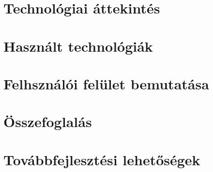\documentclass[12pt, twosides]{report}
\begin{document}
\chapter{Technológiai áttekintés}



\chapter{Használt technológiák}



\chapter{Felhsználói felület bemutatása}


\chapter{Összefoglalás}


\chapter{Továbbfejlesztési lehetőségek}




%
\end{document}
